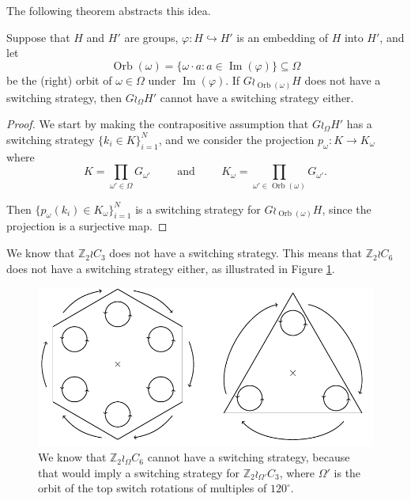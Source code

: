 The following theorem abstracts this idea.
\begin{theorem}
  Suppose that $H$ and $H'$ are groups,
  $\varphi \colon H \hookrightarrow H'$ is an embedding of $H$ into $H'$, and
  let
  \begin{equation}
    \operatorname{Orb}(\omega)
      = \{\omega \cdot a : a \in \operatorname{Im}(\varphi) \} \subseteq \Omega
  \end{equation}
  be the (right) orbit of $\omega \in \Omega$ under $\operatorname{Im}(\varphi)$.
  If $G \wr_{\operatorname{Orb}(\omega)} H$ does not have a switching strategy,
  then $G \wr_\Omega H'$ cannot have a switching strategy either.
  \label{thm:SpinReduction2}
\end{theorem}
\begin{proof}
  We start by making the contrapositive assumption that $G \wr_\Omega H'$
  has a switching strategy ${\{k_i \in K\}_{i=1}^N}$,
  and we consider the projection
  $p_\omega \colon K \rightarrow K_\omega$ where
  \begin{equation}
    K = \prod_{\omega' \in \Omega} G_{\omega'}
    \hspace{1cm}\text{and}\hspace{1cm}
    K_{\omega} = \prod_{\omega' \in \operatorname{Orb}(\omega)} G_{\omega'}.
  \end{equation}

  Then $\{p_\omega(k_i) \in K_\omega\}_{i=1}^N$ is a switching strategy for
  $G \wr_{\operatorname{Orb}(\omega)} H$, since the projection is a surjective
  map.
\end{proof}

\begin{example}
  We know that $\mathbb Z_2 \wr C_3$ does not have a switching strategy.
  This means that $\mathbb Z_2 \wr C_6$ does not have a switching strategy either,
  as illustrated in Figure \ref{fig:Z2C6_2}.
\end{example}
\begin{figure}
  \center
  \includegraphics{assets/tikz_Z2C6_2.pdf}
  \caption[A reduction from a hexagonal table to a triangular table.]{
    We know that $\mathbb Z_2 \wr_\Omega C_6$ cannot have
    a switching strategy, because that would imply a switching strategy for
    $\mathbb Z_2 \wr_{\Omega'} C_3$, where $\Omega'$
    is the orbit of the top switch rotations of multiples of $120^\circ$.
  }
  \label{fig:Z2C6_2}
\end{figure}

